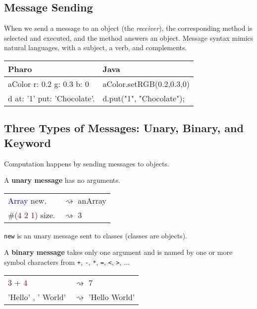 \documentclass[notumble]{leaflet}
\newcommand{\code}[1]{\foreignlanguage{english}{\texttt{#1}}}
\begin{document}

\subsection{Message Sending}
When we send a message to an object (the \emph{receiver}), the corresponding method is selected and executed, and the method answers an object. Message syntax mimics natural languages, with a subject, a verb, and complements.

\noindent
\begin{tabularx}{\linewidth}{@{}lX@{}}
        \toprule
        \textbf{Pharo} & \textbf{Java}\\
\midrule
aColor r: 0.2 g: 0.3 b: 0&aColor.setRGB(0.2,0.3,0)\\
d at: '1' put: 'Chocolate'.&d.put("1", "Chocolate");\\
\midrule
\end{tabularx}

\vspace{-0.3cm}
\subsection{Three Types of Messages: Unary, Binary, and Keyword}
Computation happens by sending messages to objects. 

A \textbf{unary message} has no arguments.

\noindent
\begin{tabularx}{\linewidth}{@{}lX@{}}
        \toprule
      \textcolor{darkBlue}{Array} new.& $\rightsquigarrow$ anArray \\
      \#(\textcolor{darkRed}{4 2 1}) size.& $\rightsquigarrow$ 3\\
       \midrule
\end{tabularx}

\code{new} is an unary message sent to classes (classes are objects). 

A \textbf{binary message} takes only one
argument and is named by one or more symbol characters from \code{+}, \code{-}, \code{*}, \code{=}, \code{<}, \code{>}, ...

\noindent
\begin{tabularx}{\linewidth}{@{}lX@{}}
        \toprule
      \textcolor{darkRed}{3} + \textcolor{darkRed}{4}& $\rightsquigarrow$ 7 \\
     \textcolor{string}{'Hello'} , \textcolor{string}{' World'}& $\rightsquigarrow$ 'Hello World'\\
       \midrule
\end{tabularx}
\end{document}
